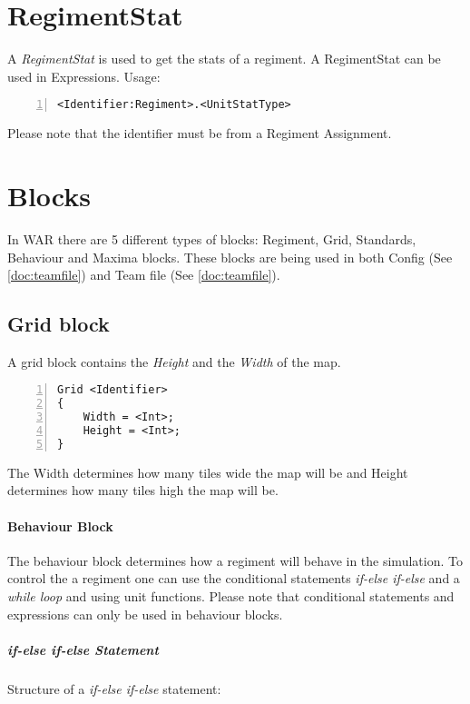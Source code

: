\section{RegimentStat}
	A {\it RegimentStat} is used to get the stats of a regiment. A RegimentStat can be used in Expressions. Usage:\\

		\begin{lstlisting}[basicstyle=\small\sffamily,
		keywordstyle={\color{blue}},
		comment={[l]{//}}, morecomment={[s]{/*}{*/}}, commentstyle=\itshape,
		columns={[l]flexible}, numbers=left, numberstyle=\tiny,
		frameround=fftt, frame=shadowbox, captionpos=b,
		caption={Regiment Assignment},
		label=RegimentAssignment]
<Identifier:Regiment>.<UnitStatType>
	\end{lstlisting}
	Please note that the identifier must be from a Regiment Assignment.

\section{Blocks}
\label{doc:blocks}
	In WAR there are 5 different types of blocks: Regiment, Grid, Standards, Behaviour and Maxima blocks. 
	These blocks are being used in both Config (See \ref{doc:teamfile}) and Team file (See \ref{doc:teamfile}).
	\subsection{Grid block}
		A grid block contains the {\it Height} and the {\it Width }of the map.

		\begin{lstlisting}[basicstyle=\small\sffamily,
		keywordstyle={\color{blue}},
		comment={[l]{//}}, morecomment={[s]{/*}{*/}}, commentstyle=\itshape,
		columns={[l]flexible}, numbers=left, numberstyle=\tiny,
		frameround=fftt, frame=shadowbox, captionpos=b,
		caption={Regiment Assignment},
		label=RegimentAssignment]
Grid <Identifier>
{
	Width = <Int>;
	Height = <Int>;
}
		\end{lstlisting}	
		The Width determines how many tiles wide the map will be and Height determines how many tiles high the map will be.
	\paragraph{Behaviour Block}
		The behaviour block determines how a regiment will behave in the simulation. To control the a regiment one can 
		use the conditional statements {\it if-else if-else} and a {\it while loop} and using unit functions. Please note that 
		conditional statements and expressions can only be used in behaviour blocks.
		\subparagraph{if-else if-else Statement}
			Structure of a {\it if-else if-else} statement: \\

